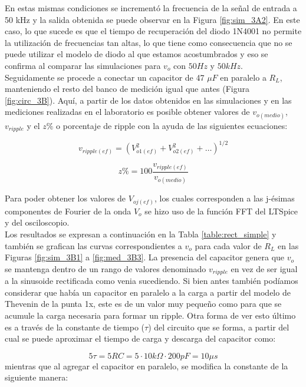 En estas mismas condiciones se incrementó la frecuencia de la señal de entrada a 50 kHz y la salida obtenida se puede observar en la Figura \ref{fig:sim_3A2}. En este caso, lo que sucede es que el tiempo de recuperación del diodo 1N4001 no permite la utilización de frecuencias tan altas, lo que tiene como consecuencia que no se puede utilizar el modelo de diodo al que estamos acostumbrados y eso se confirma al comparar las simulaciones para $v_{o}$ con $50Hz$ y $50kHz$.\\

Seguidamente se procede a conectar un capacitor de 47 $\mu F$ en paralelo a $R_{L}$, manteniendo el resto del banco de medición igual que antes (Figura \ref{fig:circ_3B}). Aquí, a partir de los datos obtenidos en las simulaciones y en las mediciones realizadas en el laboratorio es posible obtener valores de $v_{o (medio)}$, $v_{ripple}$ y el $z\%$ o porcentaje de ripple con la ayuda de las siguientes ecuaciones:

\begin{equation}
v_{ripple (ef)} = ( V_{o1 (ef)}^{2} + V_{o2 (ef)}^{2} + \ldots )^{1/2}
\end{equation}

\begin{equation}
z\% = 100 \frac{v_{ripple (ef)}}{v_{o (medio)}} 
\end{equation}

Para poder obtener los valores de $V_{oj (ef)}$, los cuales corresponden a las j-ésimas componentes de Fourier de la onda $V_{o}$ se hizo uso de la función FFT del LTSpice y del osciloscopio.\\

Los resultados se expresan a continuación en la Tabla \ref{table:rect_simple} y también se grafican las curvas correspondientes a $v_{o}$ para cada valor de $R_{L}$ en las Figuras \ref{fig:sim_3B1} a \ref{fig:med_3B3}. La presencia del capacitor genera que $v_{o}$ se mantenga dentro de un rango de valores denominado $v_{ripple}$ en vez de ser igual a la sinusoide rectificada como venia sucediendo. Si bien antes también podíamos considerar que había un capacitor en paralelo a la carga a partir del modelo de Thevenin de la punta 1x, este es de un valor muy pequeño como para que se acumule la carga necesaria para formar un ripple. Otra forma de ver esto último es a través de la constante de tiempo ($\tau$) del circuito que se forma, a partir del cual se puede aproximar el tiempo de carga y descarga del capacitor como:

\begin{equation}
5 \tau = 5 R C = 5 \cdot 10 k\Omega \cdot 200 pF = 10 \mu s
\end{equation}
mientras que al agregar el capacitor en paralelo, se modifica la constante de la siguiente manera: 

